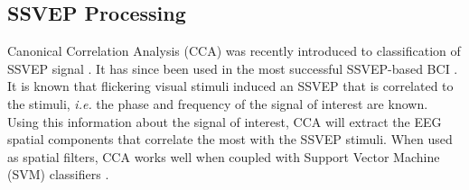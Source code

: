 
\subsection{SSVEP Processing}%
\label{subsec:sign_proc_ssvep}
Canonical Correlation Analysis (CCA) was recently introduced to classification of SSVEP signal \citep{lin_frequency_2006}. 
It has since been used in the most successful SSVEP-based BCI \citep{bin_online_2009, nakanishi_high-speed_2014}.
It is known that flickering visual stimuli induced an SSVEP that is correlated to the stimuli, \textit{i.e.} the phase and frequency of the signal of interest are known. 
Using this information about the signal of interest, CCA will extract the EEG spatial components that correlate the most with the SSVEP stimuli.
When used as spatial filters, CCA works well when coupled with Support Vector Machine (SVM) classifiers \citep{spuler_one_2012, kalunga_ssvep_2013}.  

